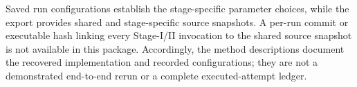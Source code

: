 Saved run configurations establish the stage-specific parameter choices, while the export provides shared and stage-specific source snapshots. A per-run commit or executable hash linking every Stage-I/II invocation to the shared source snapshot is not available in this package. Accordingly, the method descriptions document the recovered implementation and recorded configurations; they are not a demonstrated end-to-end rerun or a complete executed-attempt ledger.
